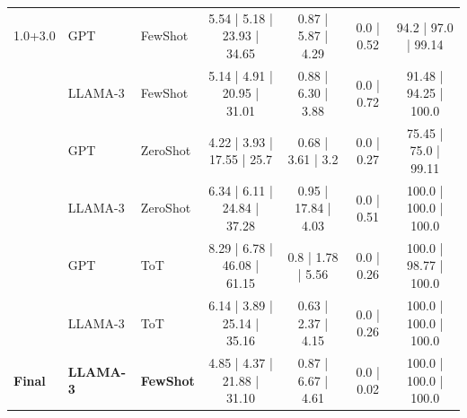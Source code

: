 \begin{table}[t]
{\begin{tabular}{lllcccc}
\midrule
1.0+3.0 & GPT & FewShot & 5.54 | 5.18 | 23.93 | 34.65 & 0.87 | 5.87 | 4.29 & 0.0 | 0.52 & 94.2 | 97.0 | 99.14 \\
 & LLAMA-3 & FewShot & 5.14 | 4.91 | 20.95 | 31.01 & 0.88 | 6.30 | 3.88 & 0.0 | 0.72 & 91.48 | 94.25 | 100.0 \\
 & GPT & ZeroShot & 4.22 | 3.93 | 17.55 | 25.7 & 0.68 | 3.61 | 3.2 & 0.0 | 0.27 & 75.45 | 75.0 | 99.11 \\
 & LLAMA-3 & ZeroShot & 6.34 | 6.11 | 24.84 | 37.28 & 0.95 | 17.84 | 4.03 & 0.0 | 0.51 & 100.0 | 100.0 | 100.0 \\
 & GPT & ToT & 8.29 | 6.78 | 46.08 | 61.15 & 0.8 | 1.78 | 5.56 & 0.0 | 0.26 & 100.0 | 98.77 | 100.0 \\
 & LLAMA-3 & ToT & 6.14 | 3.89 | 25.14 | 35.16 & 0.63 | 2.37 | 4.15 & 0.0 | 0.26 & 100.0 | 100.0 | 100.0 \\
\midrule
\rowcolor{gray!15}
\textbf{Final} & \textbf{LLAMA-3} & \textbf{FewShot} & 4.85 | 4.37 | 21.88 | 31.10 & 0.87 | 6.67 | 4.61 & 0.0 | 0.02 & 100.0 | 100.0 | 100.0 \\
\bottomrule
\end{tabular}%
}
\end{table}
